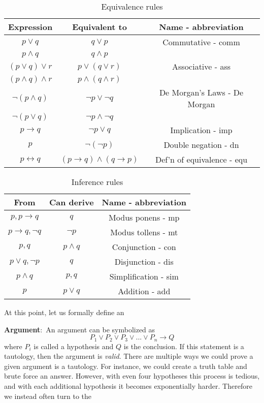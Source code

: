 \documentclass[nobib]{tufte-handout}
\newcommand{\defn}[2]{\noindent\textbf{#1}:\ #2}
\let\biconditional\leftrightarrow
\begin{document}
\begin{table}[ht]
    \centering
    \caption{Equivalence rules}
    \begin{tabular}{|c|c|c|}
    \hline
    Expression & Equivalent to & Name - abbreviation\\
    \hline
    $p \lor q$ & $q \lor p$ & Commutative - comm\\
    $p \land q$ & $q \land p $ &\\
    \hline
    $(p \lor q) \lor r$ &$p \lor (q \lor r)$ & Associative - ass\\
    $(p \land q) \land r$ &$p \land (q \land r)$ &\\
    \hline
    $\neg(p \wedge q)$ & $\neg p \vee \neg q$ & De Morgan's Laws - De Morgan\\
    $\neg(p \vee q)$ & $\neg p \wedge \neg q$ &\\
    \hline
    $p \rightarrow q$ & $\neg p \lor q$ & Implication - imp \\
    \hline
    $p$ & $\neg (\neg p)$ & Double negation - dn \\
    \hline
    $p \biconditional q$ & $(p \rightarrow q) \land (q \rightarrow p)$ & Def'n of equivalence - equ\\
    \hline
    \end{tabular}
    \label{tab:equivalencerules}
\end{table}

\begin{table}[ht]
    \centering
    \caption{Inference rules}
    \begin{tabular}{|c|c|c|}
    \hline
    From & Can derive & Name - abbreviation\\
    \hline
    $p, p \rightarrow q$ & $q$ & Modus ponens - mp\\
    $p \rightarrow q, \neg q$ & $\neg p$ & Modus tollens - mt\\
    \hline
    $p, q$ & $p \land q$ & Conjunction - con\\
    \hline
    $p \lor q, \neg p$ & $q$ & Disjunction - dis\\
    \hline
    $p \land q$ & $p, q$ & Simplification - sim\\
    \hline
    $p$ & $p \lor q$ & Addition - add\\
    \hline
    \end{tabular}
    \label{tab:inferencerules}
\end{table}

At this point, let us formally define an 

\defn{Argument}{An argument can be symbolized as 
\[P_1 \lor P_2 \lor P_3 \lor ... \lor P_n \rightarrow Q\] 
where $P_i$ is called a hypothesis and $Q$ is the conclusion.} If this statement
is a tautology, then the argument is \emph{valid}. 
There are multiple ways we could prove a given argument is a tautology.
For instance, we could create a truth table and brute force an answer.
However, with even four hypotheses this process is tedious, and with each additional hypothesis
it becomes exponentially harder. Therefore we instead often turn to the
\end{document}
